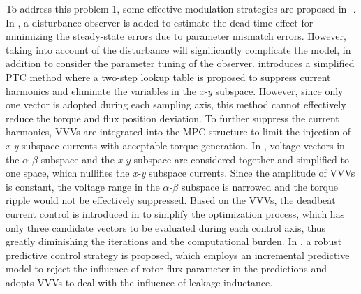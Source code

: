 \documentclass[sn-basic]{sn-jnl}
\theoremstyle{thmstyleone}%
\theoremstyle{thmstyletwo}%
\theoremstyle{thmstylethree}%
\theoremstyle{thmstyleone}%
\begin{document}
 To address this problem 1, some effective modulation strategies are proposed in \cite{9340016}-\cite{8310594}. In \cite{9340016}, a disturbance observer is added to estimate the dead-time effect for minimizing the steady-state errors due to parameter mismatch errors. However, taking into account of the disturbance will significantly complicate the model, in addition to consider the parameter tuning of the observer. \cite{8310594} introduces a simplified PTC method where a two-step lookup table is proposed to suppress current harmonics and eliminate the variables in the \textit{x-y} subspace. However, since only one vector is adopted during each sampling axis, this method cannot effectively reduce the torque and flux position deviation. To further suppress the current harmonics, VVVs are integrated into the MPC structure to limit the injection of \textit{x-y} subspace currents with acceptable torque generation\citep{9222334,9387118,9017979}. In \cite{7946187}, voltage vectors in the \textit{$\alpha$-$\beta$} subspace and the \textit{x-y} subspace are considered together and simplified to one space, which nullifies the \textit{x-y} subspace currents. Since the amplitude of VVVs is constant, the voltage range in the \textit{$\alpha$-$\beta$} subspace is narrowed and the torque ripple would not be effectively suppressed. Based on the VVVs, the deadbeat current control is introduced in \cite{8543842} to simplify the optimization process, which has only three candidate vectors to be evaluated during each control axis, thus greatly diminishing the iterations and the computational burden. In \cite{9005390}, a robust predictive control strategy is proposed, which employs an incremental predictive model to reject the influence of rotor flux parameter in the predictions and adopts VVVs to deal with the influence of leakage inductance.
\end{document}
